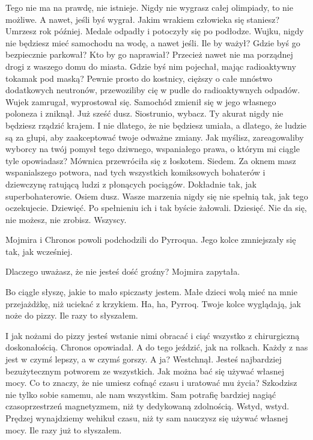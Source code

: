 \ds{}
Tego nie ma na prawdę, nie istnieje.
Nigdy nie wygrasz całej olimpiady, to nie możliwe.
A nawet, jeśli byś wygrał. Jakim wrakiem człowieka się staniesz?
Umrzesz rok później.
\dm{} Medale odpadły i potoczyły się po podłodze. \dm{}
Wujku, nigdy nie będziesz mieć samochodu na wodę, a nawet jeśli.
Ile by ważył? Gdzie byś go bezpiecznie parkował? Kto by go naprawiał?
Przecież nawet nie ma porządnej drogi z waszego domu do miasta.
Gdzie byś nim pojechał, mając radioaktywny tokamak pod maską?
Pewnie prosto do kostnicy, cięższy o całe mnóstwo dodatkowych neutronów, przewoziliby cię w pudle do radioaktywnych odpadów.
\dm{} Wujek zamrugał, wyprostował się. Samochód zmienił się w jego własnego poloneza i zniknął. Już sześć dusz. \dm{}
Siostrunio, wybacz. Ty akurat nigdy nie będziesz rządzić krajem. I nie dlatego, że nie będziesz umiała, a dlatego, że ludzie są za głupi, aby zaakceptować 
twoje odważne zmiany. Jak myślisz, zareagowaliby wyborcy na twój pomysł tego dziwnego, wspaniałego prawa, o którym mi ciągle tyle opowiadasz?
\dm{} Mównica przewróciła się z łoskotem. Siedem. \dm{}
Za oknem masz wspanialszego potwora, nad tych wszystkich komiksowych bohaterów i dziewczynę ratującą ludzi z płonących pociągów. 
Dokładnie tak, jak superbohaterowie. \dm{} Osiem dusz. \dm{}
Wasze marzenia nigdy się nie spełnią tak, jak tego oczekujecie. \dm{} Dziewięć. \dm{}
Po spełnieniu ich i tak byście żałowali. \dm{} Dziesięć. \dm{}
Nie da się, nie możesz, nie zrobisz. \dm{} Wszyscy. \dm{}

Mojmira i Chronos powoli podchodzili do Pyrroqua. Jego kolce zmniejszały się tak, jak wcześniej.

\ds{} Dlaczego uważasz, że nie jesteś dość groźny? \dm{} Mojmira zapytała. \de{}

\ds{} Bo ciągle słyszę, jakie to mało spiczasty jestem. Małe dzieci wolą mieć na mnie przejażdżkę, niż uciekać z krzykiem.
Ha, ha, Pyrroq. Twoje kolce wyglądają, jak noże do pizzy. Ile razy to słyszałem. \de{}

\ds{} I jak nożami do pizzy jesteś wstanie nimi obracać i ciąć wszystko z chirurgiczną doskonałością. \dm{} Chronos opowiadał. \dm{} A do tego jeździć, jak na rolkach.
Każdy z nas jest w czymś lepszy, a w czymś gorszy. A ja? \dm{} Westchnął. \dm{}  Jesteś najbardziej bezużytecznym potworem ze wszystkich. 
Jak można bać się używać własnej mocy. Co to znaczy, że nie umiesz cofnąć czasu i uratować mu życia? 
Szkodzisz nie tylko sobie samemu, ale nam wszystkim.
Sam potrafię bardziej nagiąć czasoprzestrzeń magnetyzmem, niż ty dedykowaną zdolnością.
Wstyd, wstyd. Prędzej wynajdziemy wehikuł czasu, niż ty sam nauczysz się używać własnej mocy. \dm{} Ile razy już to słyszałem. \de{}

